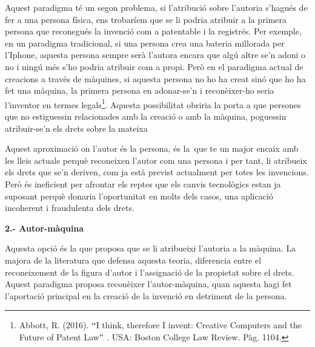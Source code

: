\documentclass[12pt]{article}
\begin{document}
\vspace{\baselineskip}
\begin{justify}
Aquest paradigma té un segon problema, si l’atribució sobre l’autoria s’hagués de fer a una persona física, ens trobaríem que se li podria atribuir a la primera persona que reconegués la invenció com a patentable i la registrés. Per exemple, en un paradigma tradicional, si una persona crea una bateria millorada per l’Iphone, aquesta persona sempre serà l’autora encara que algú altre se’n adoni o no i ningú més s’ho podria atribuir com a propi. Però en el paradigma actual de creacions a través de màquines, si aquesta persona no ho ha creat sinó que ho ha fet una màquina, la primera persona en adonar-se’n i reconèixer-ho seria l’inventor en termes legals\footnote{ Abbott, R. (2016). $``$I think, therefore I invent: Creative Computers and the Future of Patent Law$"$ . USA: Boston College Law Review. Pàg. 1104. }. Aquesta possibilitat obriria la porta a que persones que no estiguessin relacionades amb la creació o amb la màquina, poguessin atribuir-se’n els drets sobre la mateixa
\end{justify}\par


\vspace{\baselineskip}
\begin{justify}
Aquest aproximació on l’autor és la persona, és la\ que te un major encaix amb les lleis actuals perquè reconeixen l’autor com una persona  i per tant, li atribueix els drets que se’n deriven, com ja està previst actualment per totes les invencions. Però és ineficient per afrontar els reptes que els canvis tecnològics estan ja suposant perquè donaria l’oportunitat en molts dels casos, una aplicació incoherent i fraudulenta dels drets.
\end{justify}\par


\vspace{\baselineskip}
\begin{justify}
\textbf{2.- Autor-màquina}
\end{justify}\par


\vspace{\baselineskip}
Aquesta opció és la que proposa que se li atribueixi l’autoria a la màquina. La majora de la literatura que defensa aquesta teoria, diferencia entre el reconeixement de la figura d’autor i l’assignació de la propietat sobre el drets. Aquest paradigma proposa reconèixer l’autor-màquina, quan aquesta hagi fet l’aportació principal en la creació de la invenció en detriment de la persona. \par
\end{document}
